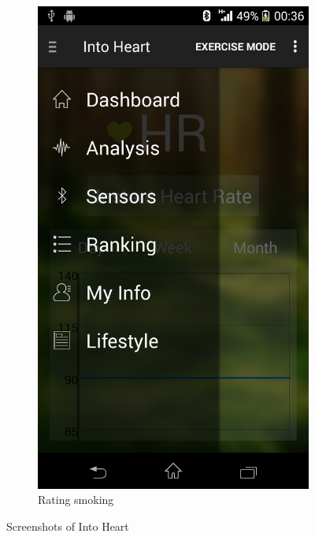 \begin{figure}
\begin{subfigure}{.24\textwidth}
  \includegraphics[width=.8\linewidth]{img/screenshot/ss11.png}
  \caption{Rating smoking}
\end{subfigure}
\caption{Screenshots of Into Heart}
\end{figure}